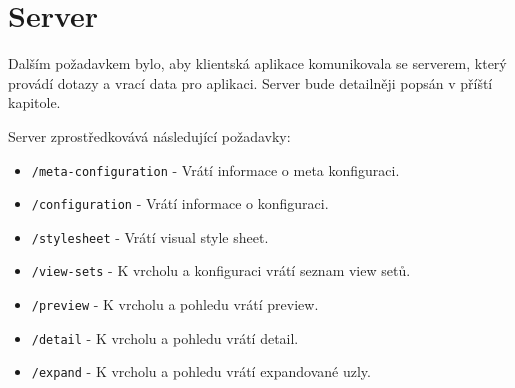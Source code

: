 \section{Server}
Dalším požadavkem bylo, aby klientská aplikace komunikovala se serverem, který provádí dotazy a vrací data pro aplikaci. Server bude detailněji popsán v příští kapitole.

Server zprostředkovává následující požadavky:
\begin{itemize}
    \item \texttt{/meta-configuration} - Vrátí informace o meta konfiguraci.

    \item \texttt{/configuration} - Vrátí informace o konfiguraci.

    \item \texttt{/stylesheet} - Vrátí visual style sheet.

    \item \texttt{/view-sets} - K vrcholu a konfiguraci vrátí seznam view setů.

    \item \texttt{/preview} - K vrcholu a pohledu vrátí preview.

    \item \texttt{/detail} - K vrcholu a pohledu vrátí detail.

    \item \texttt{/expand} - K vrcholu a pohledu vrátí expandované uzly.
\end{itemize}

\newpage







